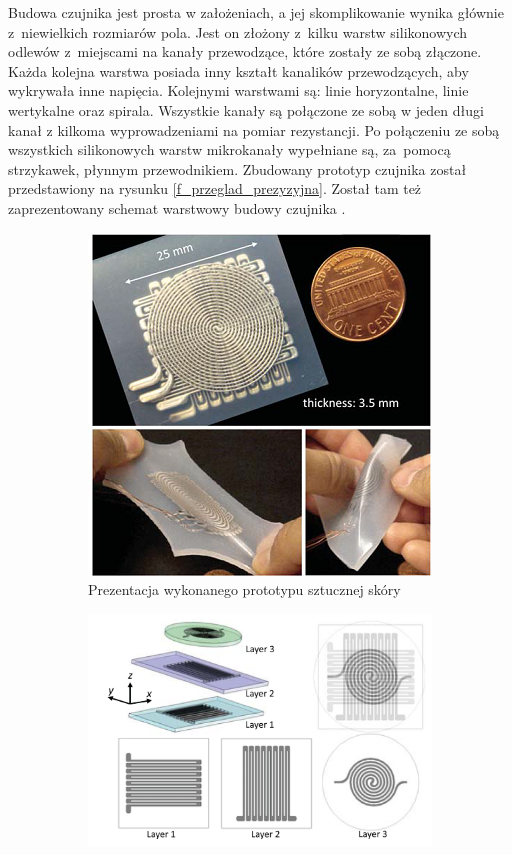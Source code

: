 Budowa czujnika jest prosta w założeniach, a jej skomplikowanie wynika głównie z~niewielkich rozmiarów pola. Jest on złożony z~kilku warstw silikonowych odlewów z~miejscami na kanały przewodzące, które zostały ze sobą złączone. Każda kolejna warstwa posiada inny kształt kanalików przewodzących, aby wykrywała inne napięcia. Kolejnymi warstwami są: linie horyzontalne, linie wertykalne oraz spirala. Wszystkie kanały są połączone ze sobą w jeden długi kanał z kilkoma wyprowadzeniami na pomiar rezystancji. Po połączeniu ze sobą wszystkich silikonowych warstw mikrokanały wypełniane są, za~pomocą strzykawek, płynnym przewodnikiem.
Zbudowany prototyp czujnika został przedstawiony na rysunku \ref{f_przeglad_prezyzyjna}. Został tam też zaprezentowany schemat warstwowy budowy czujnika \cite{b_article_tactile_precise}.

\begin{figure}[!h]
  \begin{subfigure}[t]{0.495\linewidth}
    \centering
    \includegraphics[width=0.9\linewidth]{img/precyzyjna_prezentacja.png} 
    \caption{Prezentacja wykonanego prototypu sztucznej skóry} 
  \end{subfigure}%
  \begin{subfigure}[t]{0.495\linewidth}
    \centering
    \includegraphics[width=0.95\linewidth]{img/przekroj_precyzyjna.png}

\end{subfigure}
\end{figure}
